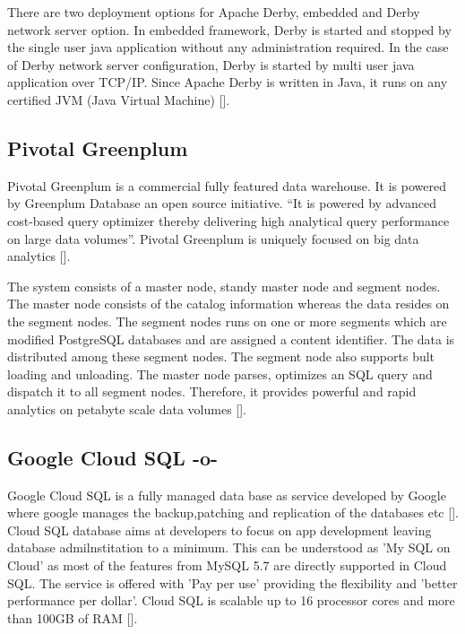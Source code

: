 There are two deployment options for Apache Derby, embedded and Derby
network server option. In embedded framework, Derby is started and
stopped by the single user java application without any administration
required. In the case of Derby network server configuration, Derby is
started by multi user java application over TCP/IP. Since Apache Derby
is written in Java, it runs on any certified JVM (Java Virtual
Machine) [\cite{www-derbymanual}].


      
\subsection{Pivotal Greenplum}

Pivotal Greenplum is a commercial fully featured data warehouse. It is
powered by Greenplum Database an open source initiative. ``It is
powered by advanced cost-based query optimizer thereby delivering high
analytical query performance on large data volumes''. Pivotal
Greenplum is uniquely focused on big data analytics [\cite{pivotal.io}].

The system consists of a master node, standy master node and segment
nodes. The master node consists of the catalog information whereas the
data resides on the segment nodes.  The segment nodes runs on one or
more segments which are modified PostgreSQL databases and are assigned
a content identifier. The data is distributed among these segment
nodes. The segment node also supports bult loading and unloading. The
master node parses, optimizes an SQL query and dispatch it to all
segment nodes. Therefore, it provides powerful and rapid analytics on
petabyte scale data volumes [\cite{pivotal_wikipedia}].
     
\subsection{Google Cloud SQL -o-}
     
Google Cloud SQL is a fully managed data base as service developed by
Google where google manages the backup,patching and replication of the
databases etc [\cite{www-cloud-sql-google}]. Cloud SQL database aims at
developers to focus on app development leaving database
admilnstitation to a minimum. This can be understood as 'My SQL on
Cloud' as most of the features from MySQL 5.7 are directly supported
in Cloud SQL. The service is offered with 'Pay per use' providing the
flexibility and 'better performance per dollar'.  Cloud SQL is
scalable up to 16 processor cores and more than 100GB of
RAM [\cite{www-cloud-sql-google-faq}].


